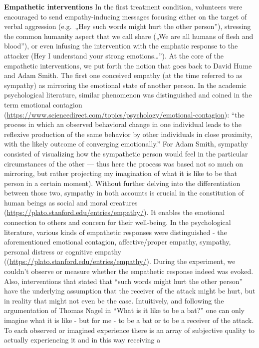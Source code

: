 \documentclass[
  10pt,
  dvipsnames,enabledeprecatedfontcommands]{scrartcl}
\begin{document}
\textbf{Empathetic interventions} In the first treatment condition,
volunteers were encouraged to send empathy-inducing messages focusing
either on the target of verbal aggression (e.g.~„Hey such words might
hurt the other person''), stressing the common humanity aspect that we
call share („We are all humans of flesh and blood''), or even infusing
the intervention with the emphatic response to the attacker (Hey I
understand your strong emotions\ldots''). At the core of the empathetic
interventions, we put forth the notion that goes back to David Hume and
Adam Smith. The first one conceived empathy (at the time referred to as
sympathy) as mirroring the emotional state of another person. In the
academic psychological literature, similar phenomenon was distinguished
and coined in the term emotional contagion
(\url{https://www.sciencedirect.com/topics/psychology/emotional-contagion}):
``the process in which an observed behavioral change in one individual
leads to the reflexive production of the same behavior by other
individuals in close proximity, with the likely outcome of converging
emotionally.'' For Adam Smith, sympathy consisted of visualizing how the
sympathetic person would feel in the particular circumstances of the
other --- thus here the process was based not so much on mirroring, but
rather projecting my imagination of what it is like to be that person in
a certain moment). Without further delving into the differentiation
between those two, sympathy in both accounts is crucial in the
constitution of human beings as social and moral creatures
(\url{https://plato.stanford.edu/entries/empathy/}). It enables the
emotional connection to others and concern for their well-being. In the
psychological literature, various kinds of empathetic responses were
distinguished - the aforementioned emotional contagion, affective/proper
empathy, sympathy, personal distress or cognitive empathy
((\url{https://plato.stanford.edu/entries/empathy/}). During the
experiment, we couldn't observe or measure whether the empathetic
response indeed was evoked. Also, interventions that stated that ``such
words might hurt the other person'' have the underlying assumption that
the receiver of the attack might be hurt, but in reality that might not
even be the case. Intuitively, and following the argumentation of Thomas
Nagel in ``What is it like to be a bat?'' one can only imagine what it
is like - but for me - to be a bat or to be a receiver of the attack. To
each observed or imagined experience there is an array of subjective
quality to actually experiencing it and in this way receiving a
\end{document}
